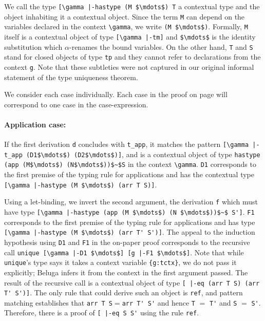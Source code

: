 We call the type \lstinline![\gamma |-hastype (M $\mdots$) T! a contextual type and
the object inhabiting it a contextual object. 
Since the term \lstinline!M! can depend on the variables declared in the
context \lstinline!\gamma!, we  write  \lstinline!(M $\mdots$)!. Formally,
\lstinline!M! itself is a contextual object of type 
\lstinline![\gamma |-tm]! and \lstinline!$\mdots$! is the identity substitution
which $\alpha$-renames the bound variables. 
On the other hand, \lstinline!T! and \lstinline!S! stand for closed
objects of type \lstinline!tp! and they cannot refer to declarations
from the context \lstinline!g!. Note that these subtleties were not
captured in our original informal statement of the type uniqueness
theorem. 

We consider each case individually. Each case in the proof on page
\pageref{sec:thmunique} will correspond to one case in the
case-expression.
%
\paragraph{Application case:} If the first derivation \lstinline{d} concludes
with \lstinline{t_app}, it matches 
the pattern \lstinline![\gamma |-t_app (D1$\mdots$) (D2$\mdots$)]!, and is
a contextual object of type 
\lstinline!hastype (app (M$\mdots$) (N$\mdots$))$~$S! in the context \lstinline!\gamma!.  %
\lstinline!D1! corresponds to the first
premise of the typing rule for applications and has the contextual type 
\lstinline![\gamma |-hastype (M $\mdots$) (arr T S)]!.

Using a let-binding, we invert the second
argument, the derivation \lstinline{f} which 
must have type
\lstinline![\gamma |-hastype (app (M $\mdots$) (N $\mdots$))$~$ S']!. \lstinline!F1!
corresponds to the first premise of the typing rule for applications
and has type \lstinline![\gamma |-hastype (M $\mdots$) (arr T' S')]!.
The appeal to the induction hypothesis using \lstinline{D1} and \lstinline{F1} in the
on-paper proof 
corresponds to the recursive call
 \lstinline!unique [\gamma |-D1 $\mdots$] [g |-F1 $\mdots$]!.
Note that while \lstinline!unique!'s type says it takes a context variable \lstinline!{g:tctx}!,
we do not pass it explicitly; Beluga infers it from the context in the first argument
passed. 
The result of the recursive call is a contextual object of type 
\lstinline![ |-eq (arr T S) (arr T' S')]!. The only rule that
could derive such an object is \lstinline{ref}, and pattern matching
establishes that \lstinline!arr T S!$=$\lstinline!arr T' S'! and hence
\lstinline!T! $=$ \lstinline!T'! and \lstinline!S! $=$ \lstinline!S'!.
Therefore, there is a proof of \lstinline![ |-eq S S'! using the
rule \lstinline!ref!.

